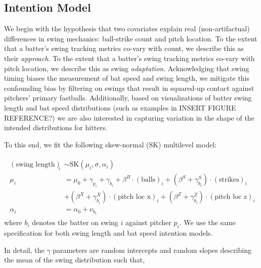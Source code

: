\documentclass{article}
\begin{document}
    \subsection{Intention Model}
    \label{sec:methods-intention}

    We begin with the hypothesis that two covariates explain real (non-artifactual) differences in swing mechanics: ball-strike count and pitch location. To the extent that a batter’s swing tracking metrics co-vary with count, we describe this as their \textit{approach}. To the extent that a batter’s swing tracking metrics co-vary with pitch location, we describe this as swing \textit{adaptation}. Acknowledging that swing timing biases the measurement of bat speed and swing length, we mitigate this confounding bias by filtering on swings that result in squared-up contact against pitchers' primary fastballs. Additionally, based on visualizations of batter swing length and bat speed distributions (such as examples in INSERT FIGURE REFERENCE?) we are also interested in capturing variation in the shape of the intended distributions for hitters. 

    To this end, we fit the following skew-normal (SK) multilevel model:

    \begin{align}
    \label{eqn:intention-swing-length}
    \begin{split}
        ( \mbox{swing length} )_i &\sim \mbox{SK}(\mu_i, \sigma, \alpha_i) \\
        \mu_i &= \mu_0 + \gamma_{p_i} + \gamma_{b_i}
        + \beta^B \cdot (\mbox{balls})_i
          + (\beta^S + \gamma^S_{b_i}) \cdot (\mbox{strikes})_i\\
        & + (\beta^X + \gamma^X_{b_i}) \cdot (\mbox{pitch loc x})_i
          + (\beta^Z + \gamma^Z_{b_i}) \cdot (\mbox{pitch loc z})_i \\
          \alpha_i &= \alpha_0 + \nu_{b_i}
    \end{split}
    \end{align}
    where $b_i$ denotes the batter on swing $i$ against pitcher $p_i$. We use the same specification for both swing length and bat speed intention models. 
    
    In detail, the $\gamma$ parameters are random intercepts and random slopes describing the mean of the swing distribution such that,
\end{document}
